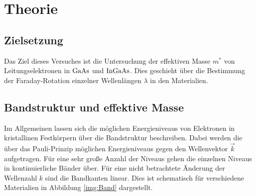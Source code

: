 \section{Theorie}

\subsection{Zielsetzung}

\noindent 
Das Ziel dieses Versuches ist die Untersuchung der effektiven Masse $m^*$ von Leitungselektronen in $\ce{GaAs}$ und $\ce{InGaAs}$. 
Dies geschieht über die Bestimmung der Faraday-Rotation einzelner Wellenlängen $\lambda$ in den Materialien.

\subsection{Bandstruktur und effektive Masse}
       

\noindent
Im Allgemeinen lassen sich die möglichen Energieniveaus von Elektronen in kristallinen Festkörpern über die Bandstruktur beschreiben. 
Dabei werden die über das Pauli-Prinzip möglichen Energieniveaus gegen den Wellenvektor $\vec{k}$ aufgetragen. 
Für eine sehr große Anzahl der Niveaus gehen die einzelnen Niveaus in kontinuierliche Bänder über.
Für eine nicht betrachtete Änderung der Wellenzahl $k$ sind die Bandkanten linear. 
Dies ist schematisch für verschiedene Materialien in Abbildung \ref{img:Band} dargestellt.\\\\


